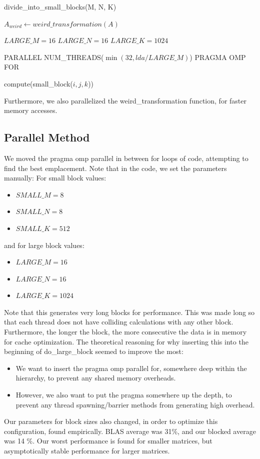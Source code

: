 \documentclass[12pt]{article}
\begin{document}
\begin{algorithm}
\caption{divide\_into\_small\_blocks(M, N, K)}
\begin{algorithmic} 
\STATE $A_{weird} \leftarrow weird\_transformation(A)$

\STATE $LARGE\_M = 16$
\STATE $LARGE\_N = 16$
\STATE $LARGE\_K = 1024$

\STATE PARALLEL NUM\_THREADS($\min(32, lda / LARGE\_M) $)
\STATE PRAGMA OMP FOR 



\STATE compute(small\_block($i,j,k$))

\ENDFOR
\ENDFOR
\ENDFOR
\end{algorithmic}
\end{algorithm}

Furthermore, we also parallelized the weird\_transformation function, for faster memory accesses. 

\subsection{Parallel Method} 
We moved the pragma omp parallel in between for loops of code, attempting to find the best emplacement. Note that in the code, we set the parameters manually:
For small block values: 
\begin{itemize}
\item $SMALL\_M = 8$
\item $SMALL\_N = 8$
\item $SMALL\_K = 512$
\end{itemize}
and for large block values:
\begin{itemize}
\item $LARGE\_M = 16$
 \item $LARGE\_N = 16$
  \item $LARGE\_K = 1024$
\end{itemize}
Note that this generates very long blocks for performance. This was made long so that each thread does not have colliding calculations with any other block. Furthermore, the longer the block, the more consecutive the data is in memory for cache optimization. The theoretical reasoning for why inserting this into the beginning of do\_large\_block seemed to improve the most: 
\begin{itemize}
\item We want to insert the pragma omp parallel for, somewhere deep within the hierarchy, to prevent any shared memory overheads. 
\item However, we also want to put the pragma somewhere up the depth, to prevent any thread spawning/barrier methods from generating high overhead. 
\end{itemize}
Our parameters for block sizes also changed, in order to optimize this configuration, found empirically. BLAS average was 31\%, and our blocked average was 14 \%. Our worst performance is found for smaller matrices, but asymptotically stable performance for larger matrices. 
\end{document}
